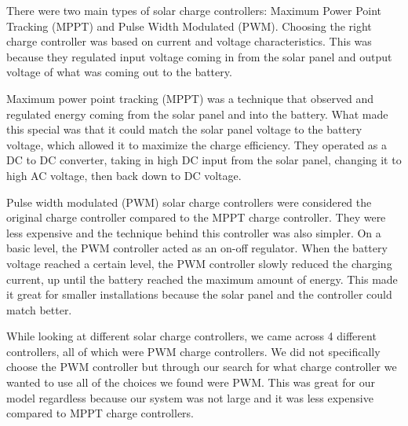 There were two main types of solar charge controllers: Maximum Power Point Tracking (MPPT) and Pulse Width Modulated (PWM). Choosing the right charge controller was based on current and voltage characteristics. This was because they regulated input voltage coming in from the solar panel and output voltage of what was coming out to the battery.

Maximum power point tracking (MPPT) was a technique that observed and regulated energy coming from the solar panel and into the battery. What made this special was that it could match the solar panel voltage to the battery voltage, which allowed it to maximize the charge efficiency. They operated as a DC to DC converter, taking in high DC input from the solar panel, changing it to high AC voltage, then back down to DC voltage.

Pulse width modulated (PWM) solar charge controllers were considered the original charge controller compared to the MPPT charge controller. They were less expensive and the technique behind this controller was also simpler. On a basic level, the PWM controller acted as an on-off regulator. When the battery voltage reached a certain level, the PWM controller slowly reduced the charging current, up until the battery reached the maximum amount of energy. This made it great for smaller installations because the solar panel and the controller could match better.

While looking at different solar charge controllers, we came across 4 different controllers, all of which were PWM charge controllers. We did not specifically choose the PWM controller but through our search for what charge controller we wanted to use all of the choices we found were PWM. This was great for our model regardless because our system was not large and it was less expensive compared to MPPT charge controllers.

